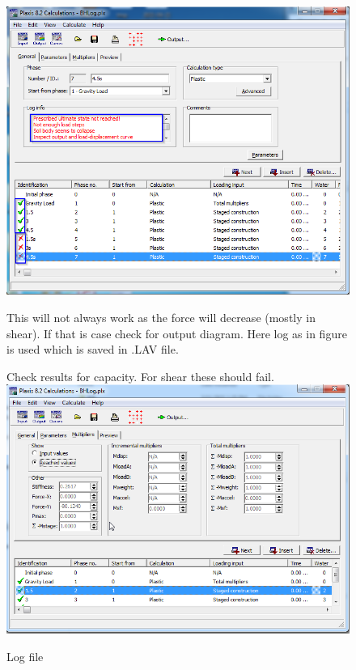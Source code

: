 \begin{landscape}
\begin{figure}[hbtp]
  \vfill
  \begin{minipage}[c]{0.6\linewidth}
  \includegraphics[width=\linewidth, height=0.8\textheight,keepaspectratio]{images/plx/a (21).png}
  \caption{Log file}
  This will not always work as the force will decrease (mostly in shear). If that is case check for output diagram. Here log as in figure is used which is saved in .LAV file.
  \end{minipage}
  \hfill
  \centering
  \begin{minipage}[c]{0.35\linewidth}
    \vfill
	Check results for capacity. For shear these should fail.
    \includegraphics[width=\linewidth, height=0.7\textheight,keepaspectratio]{images/plx/a (22).png}

\end{minipage}
\end{figure}
\end{landscape}
